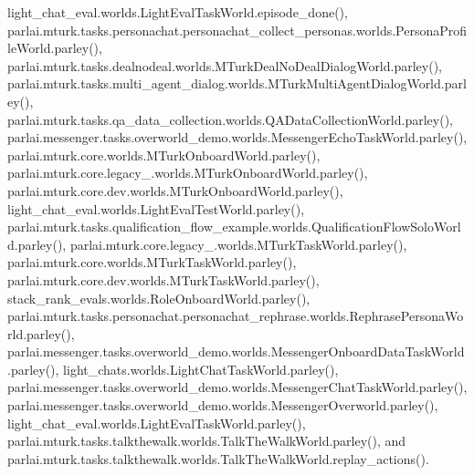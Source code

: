 light\+\_\+chat\+\_\+eval.\+worlds.\+Light\+Eval\+Task\+World.\+episode\+\_\+done(), parlai.\+mturk.\+tasks.\+personachat.\+personachat\+\_\+collect\+\_\+personas.\+worlds.\+Persona\+Profile\+World.\+parley(), parlai.\+mturk.\+tasks.\+dealnodeal.\+worlds.\+M\+Turk\+Deal\+No\+Deal\+Dialog\+World.\+parley(), parlai.\+mturk.\+tasks.\+multi\+\_\+agent\+\_\+dialog.\+worlds.\+M\+Turk\+Multi\+Agent\+Dialog\+World.\+parley(), parlai.\+mturk.\+tasks.\+qa\+\_\+data\+\_\+collection.\+worlds.\+Q\+A\+Data\+Collection\+World.\+parley(), parlai.\+messenger.\+tasks.\+overworld\+\_\+demo.\+worlds.\+Messenger\+Echo\+Task\+World.\+parley(), parlai.\+mturk.\+core.\+worlds.\+M\+Turk\+Onboard\+World.\+parley(), parlai.\+mturk.\+core.\+legacy\+\_.\+worlds.\+M\+Turk\+Onboard\+World.\+parley(), parlai.\+mturk.\+core.\+dev.\+worlds.\+M\+Turk\+Onboard\+World.\+parley(), light\+\_\+chat\+\_\+eval.\+worlds.\+Light\+Eval\+Test\+World.\+parley(), parlai.\+mturk.\+tasks.\+qualification\+\_\+flow\+\_\+example.\+worlds.\+Qualification\+Flow\+Solo\+World.\+parley(), parlai.\+mturk.\+core.\+legacy\+\_.\+worlds.\+M\+Turk\+Task\+World.\+parley(), parlai.\+mturk.\+core.\+worlds.\+M\+Turk\+Task\+World.\+parley(), parlai.\+mturk.\+core.\+dev.\+worlds.\+M\+Turk\+Task\+World.\+parley(), stack\+\_\+rank\+\_\+evals.\+worlds.\+Role\+Onboard\+World.\+parley(), parlai.\+mturk.\+tasks.\+personachat.\+personachat\+\_\+rephrase.\+worlds.\+Rephrase\+Persona\+World.\+parley(), parlai.\+messenger.\+tasks.\+overworld\+\_\+demo.\+worlds.\+Messenger\+Onboard\+Data\+Task\+World.\+parley(), light\+\_\+chats.\+worlds.\+Light\+Chat\+Task\+World.\+parley(), parlai.\+messenger.\+tasks.\+overworld\+\_\+demo.\+worlds.\+Messenger\+Chat\+Task\+World.\+parley(), parlai.\+messenger.\+tasks.\+overworld\+\_\+demo.\+worlds.\+Messenger\+Overworld.\+parley(), light\+\_\+chat\+\_\+eval.\+worlds.\+Light\+Eval\+Task\+World.\+parley(), parlai.\+mturk.\+tasks.\+talkthewalk.\+worlds.\+Talk\+The\+Walk\+World.\+parley(), and parlai.\+mturk.\+tasks.\+talkthewalk.\+worlds.\+Talk\+The\+Walk\+World.\+replay\+\_\+actions().

\mbox{\label{classparlai_1_1messenger_1_1tasks_1_1overworld__demo_1_1worlds_1_1MessengerEchoTaskWorld_ae454a3caeae9e4c642bbb4bb0a621cfd}} 

